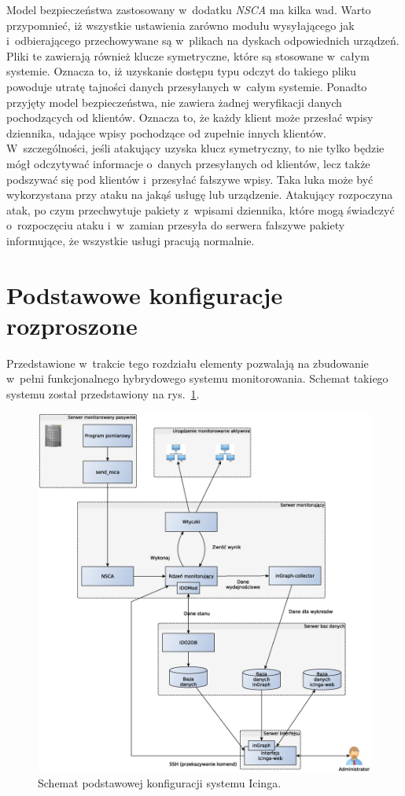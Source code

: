 Model bezpieczeństwa zastosowany w~dodatku {\em NSCA} ma kilka wad. Warto
przypomnieć, iż wszystkie ustawienia zarówno modułu wysyłającego jak
i~odbierającego przechowywane są w~plikach na dyskach odpowiednich
urządzeń. Pliki te zawierają również klucze symetryczne, które są
stosowane w~całym systemie. Oznacza to, iż uzyskanie dostępu typu
odczyt do takiego pliku powoduje utratę tajności danych przesyłanych
w~całym systemie. Ponadto przyjęty model bezpieczeństwa, nie zawiera
żadnej weryfikacji danych pochodzących od klientów. Oznacza to, że
każdy klient może przesłać wpisy dziennika, udające wpisy pochodzące
od zupełnie innych klientów. W~szczególności, jeśli atakujący uzyska
klucz symetryczny, to nie tylko będzie mógł odczytywać informacje
o~danych przesyłanych od klientów, lecz także podszywać się pod
klientów i~przesyłać fałszywe wpisy. Taka luka może być wykorzystana
przy ataku na jakąś usługę lub urządzenie. Atakujący rozpoczyna atak,
po czym przechwytuje pakiety z~wpisami dziennika, które mogą świadczyć
o~rozpoczęciu ataku i~w~zamian przesyła do serwera fałszywe pakiety
informujące, że wszystkie usługi pracują normalnie.

\section[Konfiguracje rozproszone][Podstawowe konfiguracje rozproszone]{Podstawowe konfiguracje rozproszone}

Przedstawione w~trakcie tego rozdziału elementy pozwalają na
zbudowanie w~pełni funkcjonalnego hybrydowego systemu
monitorowania. Schemat takiego systemu został przedstawiony na
rys.~\ref{fig:icingaBase}.

\begin{figure}[htpb]
  \caption{Schemat podstawowej konfiguracji systemu Icinga.}
  \label{fig:icingaBase}
\includegraphics[width=1\textwidth]{img/icingaBase}
\end{figure}

